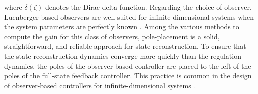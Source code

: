where $\delta(\zeta)$ denotes the Dirac delta function. Regarding the choice of observer, Luenberger-based observers are well-suited for infinite-dimensional systems when the system parameters are perfectly known \autocite{ali2015reviewobserver}. Among the various methods to compute the gain for this class of observers, pole-placement is a solid, straightforward, and reliable approach for state reconstruction. To ensure that the state reconstruction dynamics converge more quickly than the regulation dynamics, the poles of the observer-based controller are placed to the left of the poles of the full-state feedback controller. This practice is common in the design of observer-based controllers for infinite-dimensional systems \autocite{morrisbook}.
